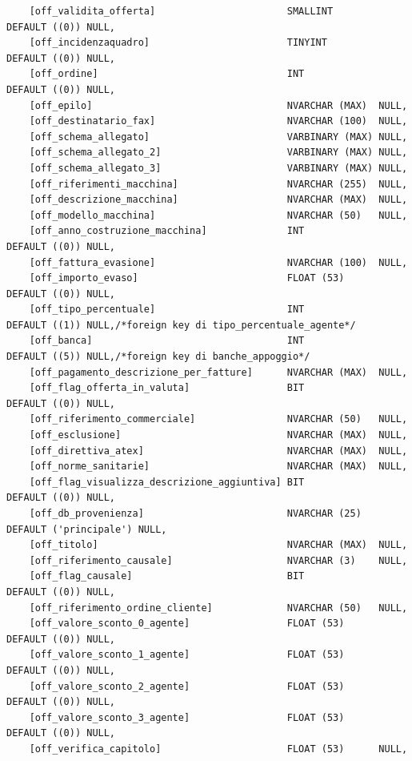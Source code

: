 \documentclass[12pt]{article}
\begin{document}
\begin{lstlisting}
    [off_validita_offerta]                       SMALLINT        DEFAULT ((0)) NULL,
    [off_incidenzaquadro]                        TINYINT         DEFAULT ((0)) NULL,
    [off_ordine]                                 INT             DEFAULT ((0)) NULL,
    [off_epilo]                                  NVARCHAR (MAX)  NULL,
    [off_destinatario_fax]                       NVARCHAR (100)  NULL,
    [off_schema_allegato]                        VARBINARY (MAX) NULL,
    [off_schema_allegato_2]                      VARBINARY (MAX) NULL,
    [off_schema_allegato_3]                      VARBINARY (MAX) NULL,
    [off_riferimenti_macchina]                   NVARCHAR (255)  NULL,
    [off_descrizione_macchina]                   NVARCHAR (MAX)  NULL,
    [off_modello_macchina]                       NVARCHAR (50)   NULL,
    [off_anno_costruzione_macchina]              INT             DEFAULT ((0)) NULL,
    [off_fattura_evasione]                       NVARCHAR (100)  NULL,
    [off_importo_evaso]                          FLOAT (53)      DEFAULT ((0)) NULL,
    [off_tipo_percentuale]                       INT             DEFAULT ((1)) NULL,/*foreign key di tipo_percentuale_agente*/
    [off_banca]                                  INT             DEFAULT ((5)) NULL,/*foreign key di banche_appoggio*/
    [off_pagamento_descrizione_per_fatture]      NVARCHAR (MAX)  NULL,
    [off_flag_offerta_in_valuta]                 BIT             DEFAULT ((0)) NULL,
    [off_riferimento_commerciale]                NVARCHAR (50)   NULL,
    [off_esclusione]                             NVARCHAR (MAX)  NULL,
    [off_direttiva_atex]                         NVARCHAR (MAX)  NULL,
    [off_norme_sanitarie]                        NVARCHAR (MAX)  NULL,
    [off_flag_visualizza_descrizione_aggiuntiva] BIT             DEFAULT ((0)) NULL,
    [off_db_provenienza]                         NVARCHAR (25)   DEFAULT ('principale') NULL,
    [off_titolo]                                 NVARCHAR (MAX)  NULL,
    [off_riferimento_causale]                    NVARCHAR (3)    NULL,
    [off_flag_causale]                           BIT             DEFAULT ((0)) NULL,
    [off_riferimento_ordine_cliente]             NVARCHAR (50)   NULL,
    [off_valore_sconto_0_agente]                 FLOAT (53)      DEFAULT ((0)) NULL,
    [off_valore_sconto_1_agente]                 FLOAT (53)      DEFAULT ((0)) NULL,
    [off_valore_sconto_2_agente]                 FLOAT (53)      DEFAULT ((0)) NULL,
    [off_valore_sconto_3_agente]                 FLOAT (53)      DEFAULT ((0)) NULL,
    [off_verifica_capitolo]                      FLOAT (53)      NULL,

\end{lstlisting}
\end{document}

